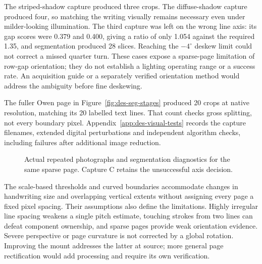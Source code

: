 The striped-shadow capture produced three crops. The diffuse-shadow capture produced four, so matching the writing visually remains necessary even under milder-looking illumination. The third capture was left on the wrong line axis: its gap scores were 0.379 and 0.400, giving a ratio of only 1.054 against the required 1.35, and segmentation produced 28 slices. Reaching the $-4^\circ$ deskew limit could not correct a missed quarter turn. These cases expose a sparse-page limitation of row-gap orientation; they do not establish a lighting operating range or a success rate. An acquisition guide or a separately verified orientation method would address the ambiguity before fine deskewing.

The fuller Owen page in Figure~\ref{fig:des-seg-stages} produced 20 crops at native resolution, matching its 20 labelled text lines. That count checks gross splitting, not every boundary pixel. Appendix~\ref{app:des-visual-tests} records the capture filenames, extended digital perturbations and independent algorithm checks, including failures after additional image reduction.


\begin{figure}[!htbp]\centering
{}
\caption{Actual repeated photographs and segmentation diagnostics for the same sparse page. Capture C retains the unsuccessful axis decision.}
\label{fig:des-seg-variation}
\end{figure}

The scale-based thresholds and curved boundaries accommodate changes in handwriting size and overlapping vertical extents without assigning every page a fixed pixel spacing. Their assumptions also define the limitations. Highly irregular line spacing weakens a single pitch estimate, touching strokes from two lines can defeat component ownership, and sparse pages provide weak orientation evidence. Severe perspective or page curvature is not corrected by a global rotation. Improving the mount addresses the latter at source; more general page rectification would add processing and require its own verification.
\FloatBarrier
